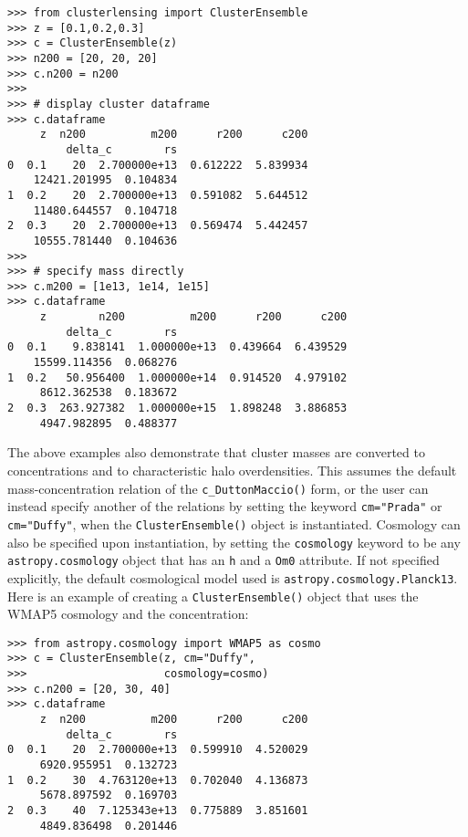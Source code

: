 \documentclass[twocolumn]{aastex6}
\newcommand{\code}{\lstinline[style=codeintext]}
\begin{document}
\begin{verbatim}
>>> from clusterlensing import ClusterEnsemble
>>> z = [0.1,0.2,0.3]
>>> c = ClusterEnsemble(z)
>>> n200 = [20, 20, 20]
>>> c.n200 = n200
>>> 
>>> # display cluster dataframe
>>> c.dataframe
     z  n200          m200      r200      c200
         delta_c        rs
0  0.1    20  2.700000e+13  0.612222  5.839934
    12421.201995  0.104834
1  0.2    20  2.700000e+13  0.591082  5.644512
    11480.644557  0.104718
2  0.3    20  2.700000e+13  0.569474  5.442457
    10555.781440  0.104636
>>> 
>>> # specify mass directly
>>> c.m200 = [1e13, 1e14, 1e15]
>>> c.dataframe
     z        n200          m200      r200      c200
         delta_c        rs
0  0.1    9.838141  1.000000e+13  0.439664  6.439529
    15599.114356  0.068276
1  0.2   50.956400  1.000000e+14  0.914520  4.979102
     8612.362538  0.183672
2  0.3  263.927382  1.000000e+15  1.898248  3.886853
     4947.982895  0.488377
\end{verbatim}

The above examples also demonstrate that cluster masses are converted to concentrations and to characteristic halo overdensities. This assumes the default mass-concentration relation of the \code{c_DuttonMaccio()} form, or the user can instead specify another of the relations by setting the keyword \code{cm="Prada"} or \code{cm="Duffy"}, when the \code{ClusterEnsemble()} object is instantiated. Cosmology can also be specified upon instantiation, by setting the \code{cosmology} keyword to be any \code{astropy.cosmology} object that has an \code{h} and a \code{Om0} attribute. If not specified explicitly, the default cosmological model used is \code{astropy.cosmology.Planck13}. Here is an example of creating a \code{ClusterEnsemble()} object that uses the WMAP5 cosmology \citep{WMAP5} and the \citet{Duffy08} concentration:
\pagebreak
\begin{verbatim}
>>> from astropy.cosmology import WMAP5 as cosmo
>>> c = ClusterEnsemble(z, cm="Duffy",
>>>                     cosmology=cosmo)
>>> c.n200 = [20, 30, 40]
>>> c.dataframe
     z  n200          m200      r200      c200
         delta_c        rs
0  0.1    20  2.700000e+13  0.599910  4.520029
     6920.955951  0.132723
1  0.2    30  4.763120e+13  0.702040  4.136873
     5678.897592  0.169703
2  0.3    40  7.125343e+13  0.775889  3.851601
     4849.836498  0.201446
\end{verbatim}
\end{document}
